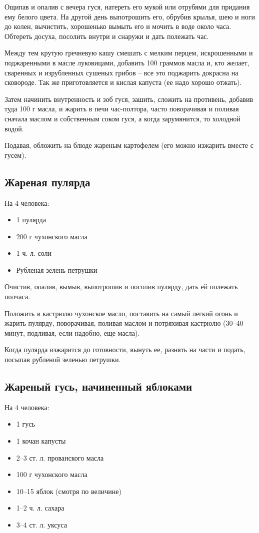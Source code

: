 Ощипав и опалив с вечера гуся, натереть его мукой или отрубями для придания ему белого цвета. На другой день выпотрошить его, обрубив крылья, шею и ноги до колен, вычистить, хорошенько вымыть его и мочить в воде около часа. Обтереть досуха, посолить внутри и снаружи и дать полежать час.

Между тем крутую гречневую кашу смешать с мелким перцем, искрошенными и поджаренными в масле луковицами, добавить 100 граммов масла и, кто желает, сваренных и изрубленных сушеных грибов – все это поджарить докрасна на сковороде. Так же приготовляется и кислая капуста (ее надо хорошо отжать).

Затем начинить внутренность и зоб гуся, зашить, сложить на противень, добавив туда 100 г масла, и жарить в печи час-полтора, часто поворачивая и поливая сначала маслом и собственным соком гуся, а когда зарумянится, то холодной водой.

Подавая, обложить на блюде жареным картофелем (его можно изжарить вместе с гусем).

\subsection{Жареная пулярда}
На 4 человека:
\begin{itemize}
	\item  1 пулярда 
    \item 200 г чухонского масла 
    \item 1 ч. л. соли
    \item Рубленая зелень петрушки
\end{itemize}

Очистив, опалив, вымыв, выпотрошив и посолив пулярду, дать ей полежать полчаса.

Положить в кастрюлю чухонское масло, поставить на самый легкий огонь и жарить пулярду, поворачивая, поливая маслом и потряхивая кастрюлю (30–40 минут, подливая, если надобно, еще масла).

Когда пулярда изжарится до готовности, вынуть ее, разнять на части и подать, посыпав рубленой зеленью петрушки.

\subsection{Жареный гусь, начиненный яблоками}
На 4 человека:

\begin{itemize}
	\item 1 гусь 
    \item 1 кочан капусты 
    \item 2–3 ст. л. прованского масла 
    \item 100 г чухонского масла 
    \item 10–15 яблок (смотря по величине) 
    \item 1–2 ч. л. сахара 
    \item 3–4 ст. л. уксуса
\end{itemize}

